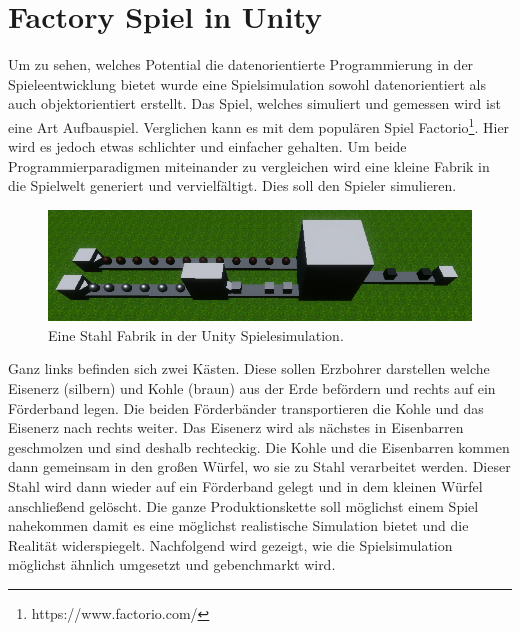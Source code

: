 \documentclass[12pt, titlepage]{article}
\DeclareRobustCommand{\#}{\adjustbox{valign=B,totalheight=.57\baselineskip}{\oldhash}}%
\begin{document}
\section{Factory Spiel in Unity}
Um zu sehen, welches Potential die datenorientierte Programmierung in der Spieleentwicklung bietet wurde eine Spielsimulation sowohl datenorientiert als auch objektorientiert erstellt. Das Spiel, welches simuliert und gemessen wird ist eine Art Aufbauspiel. Verglichen kann es mit dem populären Spiel Factorio\footnote{https://www.factorio.com/}. Hier wird es jedoch etwas schlichter und einfacher gehalten. Um beide Programmierparadigmen miteinander zu vergleichen wird eine kleine Fabrik in die Spielwelt generiert und vervielfältigt. Dies soll den Spieler simulieren. 
\begin{figure}[H]
\includegraphics[scale=0.87]{Bilder/Stahl Fabrik.png}
\caption{Eine Stahl Fabrik in der Unity Spielesimulation.}
\label{fig:steel}
\end{figure}
Ganz links befinden sich zwei Kästen. Diese sollen Erzbohrer darstellen welche Eisenerz (silbern) und Kohle (braun) aus der Erde befördern und rechts auf ein Förderband legen. Die beiden Förderbänder transportieren die Kohle und das Eisenerz nach rechts weiter. Das Eisenerz wird als nächstes in Eisenbarren geschmolzen und sind deshalb rechteckig. Die Kohle und die Eisenbarren kommen dann gemeinsam in den großen Würfel, wo sie zu Stahl verarbeitet werden. Dieser Stahl wird dann wieder auf ein Förderband gelegt und in dem kleinen Würfel anschließend gelöscht. Die ganze Produktionskette soll möglichst einem Spiel nahekommen damit es eine möglichst realistische Simulation bietet und die Realität widerspiegelt. Nachfolgend wird gezeigt, wie die Spielsimulation möglichst ähnlich umgesetzt und gebenchmarkt wird.
\end{document}
